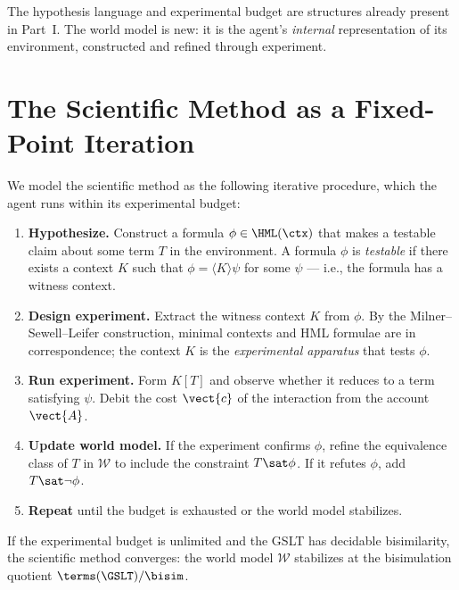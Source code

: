 \begin{remark}
The hypothesis language and experimental budget are structures
already present in Part~I.
The world model is new: it is the agent's \emph{internal} representation
of its environment, constructed and refined through experiment.
\end{remark}

\section{The Scientific Method as a Fixed-Point Iteration}

We model the scientific method as the following iterative procedure,
which the agent runs within its experimental budget:

\begin{enumerate}[label=\textbf{Step \arabic*.}, leftmargin=*, itemsep=4pt]
  \item \textbf{Hypothesize.} Construct a formula
        $\phi \in \HML(\ctx)$ that makes a testable claim about
        some term $T$ in the environment.
        A formula $\phi$ is \emph{testable} if there exists a
        context $K$ such that $\phi = \langle K \rangle \psi$
        for some $\psi$ --- i.e., the formula has a witness context.

  \item \textbf{Design experiment.} Extract the witness context $K$
        from $\phi$.
        By the Milner--Sewell--Leifer construction, minimal contexts
        and HML formulae are in correspondence; the context $K$ is
        the \emph{experimental apparatus} that tests $\phi$.

  \item \textbf{Run experiment.} Form $K[T]$ and observe whether it
        reduces to a term satisfying $\psi$.
        Debit the cost $\vect{c}$ of the interaction from the account
        $\vect{A}$.

  \item \textbf{Update world model.} If the experiment confirms $\phi$,
        refine the equivalence class of $T$ in $\mathcal{W}$ to include
        the constraint $T \sat \phi$.
        If it refutes $\phi$, add $T \sat \neg\phi$.

  \item \textbf{Repeat} until the budget is exhausted or the world
        model stabilizes.
\end{enumerate}

\begin{proposition}
If the experimental budget is unlimited and the GSLT has decidable
bisimilarity, the scientific method converges: the world model
$\mathcal{W}$ stabilizes at the bisimulation quotient
$\terms(\GSLT)/{\bisim}$.
\end{proposition}

